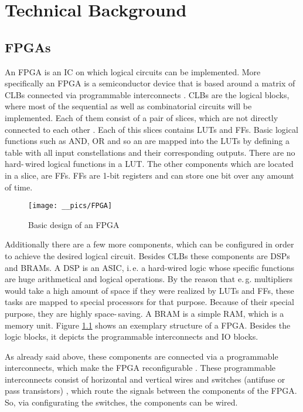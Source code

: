 
\chapter{Technical Background}
\label{ch:technical}
\section{FPGAs}
\label{ch:fpgas}

An \ac{FPGA} is an \ac{IC} on which logical circuits can be implemented. More specifically an \ac{FPGA} is a semiconductor device that is based around a matrix of \acp{CLB} connected via programmable interconnects \cite{Xilinx}. \acp{CLB} are the logical blocks, where most of the sequential as well as combinatorial circuits will be implemented. Each of them consist of a pair of slices, which are not directly connected to each other \cite{Xilinx2012a}. Each of this slices contains \acp{LUT} and \acp{FF}. Basic logical functions such as AND, OR and so an are mapped into the \acp{LUT} by defining a table with all input constellations and their corresponding outputs. There are no hard-\,wired logical functions in a \ac{LUT}. 
The other components which are located in a  slice, are \acp{FF}. \acp{FF} are 1-bit registers and can store one bit over any amount of time. 

\begin{figure}[h]
		\texttt{[image: \_\_pics/FPGA]}
		\caption{Basic design of an FPGA \cite{Website}}
		\label{pic:fpga}	
	\end{figure}

Additionally there are a few more components, which can be configured in order to achieve the desired logical circuit. Besides \acp{CLB} these components are \acp{DSP} and \acp{BRAM}. A \ac{DSP} is an \ac{ASIC}, i.\,e. a hard-wired logic whose specific functions are huge arithmetical and logical operations. By the reason that e.\,g. multipliers would take a high amount of space if they were realized by \acp{LUT} and \acp{FF}, these tasks are mapped to special processors for that purpose. Because of their special purpose, they are highly space-\,saving. A \ac{BRAM} is a simple \ac{RAM}, which is a memory unit. Figure \ref{pic:fpga} shows an exemplary structure of a \ac{FPGA}. Besides the logic blocks, it depicts the programmable interconnects and \ac{IO} blocks.


As already said above, these components are connected via a programmable interconnects, which make the \ac{FPGA} reconfigurable \cite{Dubey2009}. These programmable interconnects consist of horizontal and vertical wires and switches (antifuse or pass transistors) \cite{Www.ycce.edu}, which route the signals between the components of the \ac{FPGA}. So, via configurating the switches, the components can be wired.

